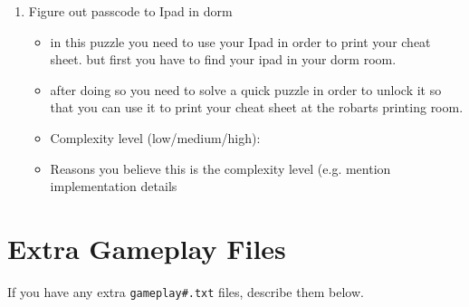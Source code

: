 \documentclass[11pt]{article}
\begin{document}
\begin{enumerate}
\item Figure out passcode to Ipad in dorm
	\begin{itemize}
	\item in this puzzle you need to use your Ipad in order to print your cheat sheet. but first you have to find your ipad in your dorm room.
	\item after doing so you need to solve a quick puzzle in order to unlock it so that you can use it to print your cheat sheet at the robarts printing room.
	\item Complexity level (low/medium/high):
	\item Reasons you believe this is the complexity level (e.g. mention implementation details
	\end{itemize}
\end{enumerate}


\section*{Extra Gameplay Files}

If you have any extra \texttt{gameplay\#.txt} files, describe them below.
\end{document}
